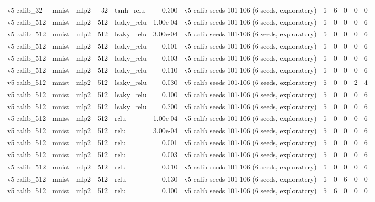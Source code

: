 \begin{table}[htbp]
{\begin{tabular}{@{}lllrlrlrrrrr@{}}
v5 calib\_32 & mnist & mlp2 & 32 & tanh+relu & 0.300 & v5 calib seeds 101-106 (6 seeds, exploratory) & 6 & 6 & 0 & 0 & 0 \\
v5 calib\_512 & mnist & mlp2 & 512 & leaky\_relu & 1.00e-04 & v5 calib seeds 101-106 (6 seeds, exploratory) & 6 & 0 & 0 & 0 & 6 \\
v5 calib\_512 & mnist & mlp2 & 512 & leaky\_relu & 3.00e-04 & v5 calib seeds 101-106 (6 seeds, exploratory) & 6 & 0 & 0 & 0 & 6 \\
v5 calib\_512 & mnist & mlp2 & 512 & leaky\_relu & 0.001 & v5 calib seeds 101-106 (6 seeds, exploratory) & 6 & 0 & 0 & 0 & 6 \\
v5 calib\_512 & mnist & mlp2 & 512 & leaky\_relu & 0.003 & v5 calib seeds 101-106 (6 seeds, exploratory) & 6 & 0 & 0 & 0 & 6 \\
v5 calib\_512 & mnist & mlp2 & 512 & leaky\_relu & 0.010 & v5 calib seeds 101-106 (6 seeds, exploratory) & 6 & 0 & 0 & 0 & 6 \\
v5 calib\_512 & mnist & mlp2 & 512 & leaky\_relu & 0.030 & v5 calib seeds 101-106 (6 seeds, exploratory) & 6 & 0 & 0 & 2 & 4 \\
v5 calib\_512 & mnist & mlp2 & 512 & leaky\_relu & 0.100 & v5 calib seeds 101-106 (6 seeds, exploratory) & 6 & 0 & 0 & 0 & 6 \\
v5 calib\_512 & mnist & mlp2 & 512 & leaky\_relu & 0.300 & v5 calib seeds 101-106 (6 seeds, exploratory) & 6 & 0 & 0 & 0 & 6 \\
v5 calib\_512 & mnist & mlp2 & 512 & relu & 1.00e-04 & v5 calib seeds 101-106 (6 seeds, exploratory) & 6 & 0 & 0 & 0 & 6 \\
v5 calib\_512 & mnist & mlp2 & 512 & relu & 3.00e-04 & v5 calib seeds 101-106 (6 seeds, exploratory) & 6 & 0 & 0 & 0 & 6 \\
v5 calib\_512 & mnist & mlp2 & 512 & relu & 0.001 & v5 calib seeds 101-106 (6 seeds, exploratory) & 6 & 0 & 0 & 0 & 6 \\
v5 calib\_512 & mnist & mlp2 & 512 & relu & 0.003 & v5 calib seeds 101-106 (6 seeds, exploratory) & 6 & 0 & 0 & 0 & 6 \\
v5 calib\_512 & mnist & mlp2 & 512 & relu & 0.010 & v5 calib seeds 101-106 (6 seeds, exploratory) & 6 & 0 & 0 & 0 & 6 \\
v5 calib\_512 & mnist & mlp2 & 512 & relu & 0.030 & v5 calib seeds 101-106 (6 seeds, exploratory) & 6 & 0 & 6 & 0 & 0 \\
v5 calib\_512 & mnist & mlp2 & 512 & relu & 0.100 & v5 calib seeds 101-106 (6 seeds, exploratory) & 6 & 6 & 0 & 0 & 0 \\

\end{tabular}}
\end{table}

